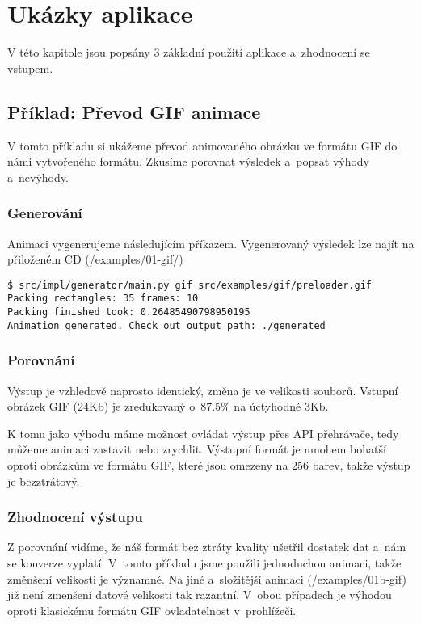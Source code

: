 
\chapter{Ukázky aplikace}

V této kapitole jsou popsány 3 základní použití aplikace a~zhodnocení se vstupem. 

\section{Příklad: Převod GIF animace}
\label{section:example1}

V tomto příkladu si ukážeme převod animovaného obrázku ve formátu GIF do námi vytvořeného formátu. Zkusíme porovnat výsledek a~popsat výhody a~nevýhody. 

\subsection{Generování}

Animaci vygenerujeme následujícím příkazem. Vygenerovaný výsledek lze najít na přiloženém CD (/examples/01-gif/)

\begin{lstlisting}
$ src/impl/generator/main.py gif src/examples/gif/preloader.gif
Packing rectangles: 35 frames: 10
Packing finished took: 0.26485490798950195
Animation generated. Check out output path: ./generated
\end{lstlisting}

\subsection{Porovnání}

Výstup je vzhledově naprosto identický, změna je ve velikosti  souborů. Vstupní obrázek GIF (24Kb) je zredukovaný o~87.5\% na úctyhodné 3Kb. 

K tomu jako výhodu máme možnost ovládat výstup přes API přehrávače, tedy můžeme animaci zastavit nebo zrychlit. Výstupní formát je mnohem bohatší oproti obrázkům ve formátu GIF, které jsou omezeny na 256 barev, takže výstup je bezztrátový.

\subsection{Zhodnocení výstupu}

Z porovnání vidíme, že náš formát bez ztráty kvality ušetřil dostatek dat a~nám se konverze vyplatí. V~tomto příkladu jsme použili jednoduchou animaci, takže změnšení velikosti je významné. Na jiné a~složitější animaci (/examples/01b-gif) již není zmenšení datové velikosti tak razantní. V~obou případech je výhodou oproti klasickému formátu GIF ovladatelnost v~prohlížeči. 

